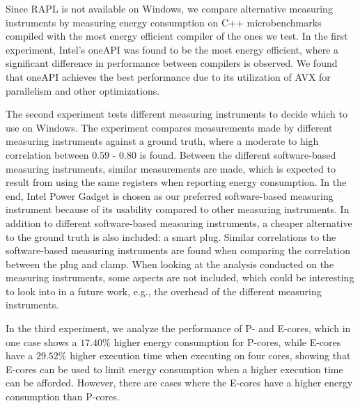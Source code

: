 Since RAPL is not available on Windows, we compare alternative measuring instruments by measuring energy consumption on C++ microbenchmarks compiled with the most energy efficient compiler of the ones we test. In the first experiment, Intel's oneAPI was found to be the most energy efficient, where a significant difference in performance between compilers is observed. We found that oneAPI achieves the best performance due to its utilization of AVX for parallelism and other optimizations.


The second experiment tests different measuring instruments to decide which to use on Windows. The experiment compares measurements made by different measuring instruments against a ground truth, where a moderate to high correlation between $0.59$ - $0.80$ is found. Between the different software-based measuring instruments, similar measurements are made, which is expected to result from using the same registers when reporting energy consumption. In the end, Intel Power Gadget is chosen as our preferred software-based measuring instrument because of its usability compared to other measuring instruments. In addition to different software-based measuring instruments, a cheaper alternative to the ground truth is also included: a smart plug. Similar correlations to the software-based measuring instruments are found when comparing the correlation between the plug and clamp. When looking at the analysis conducted on the measuring instruments, some aspects are not included, which could be interesting to look into in a future work, e.g., the overhead of the different measuring instruments.

In the third experiment, we analyze the performance of P- and E-cores, which in one case shows a $17.40\%$ higher energy consumption for P-cores, while E-cores have a $29.52\%$ higher execution time when executing on four cores, showing that E-cores can be used to limit energy consumption when a higher execution time can be afforded. However, there are cases where the E-cores have a higher energy consumption than P-cores.




